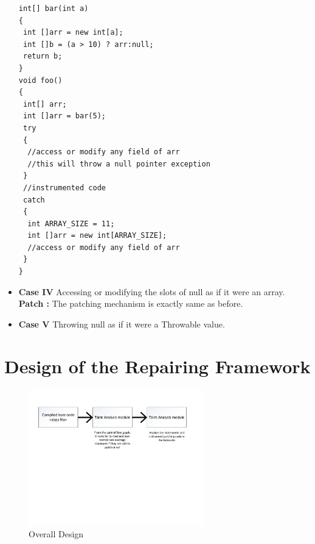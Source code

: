 \documentclass{sigplanconf}
\begin{document}
\begin{itemize}
  \lstset{language=Java, caption=array null pointer exception,
  label=patchingexample2}

\begin{lstlisting}
int[] bar(int a)
{
 int []arr = new int[a];
 int []b = (a > 10) ? arr:null;
 return b; 
}
void foo()
{
 int[] arr;
 int []arr = bar(5);
 try
 {
  //access or modify any field of arr
  //this will throw a null pointer exception
 }
 //instrumented code
 catch
 {
  int ARRAY_SIZE = 11;
  int []arr = new int[ARRAY_SIZE];
  //access or modify any field of arr
 }
}
\end{lstlisting}
  \item \textbf{Case IV} Accessing or modifying the slots of null as if it were
  an array.
 \textbf{Patch :} The patching mechanism is exactly same as before.
 
  \item \textbf{Case V} Throwing null as if it were a Throwable value.
\end{itemize}


\section{Design of the Repairing Framework}
\label{sec:Design}


\begin{figure}[!htb]
\centering
\includegraphics[width=3.0in]{images/OverallDesign.pdf}
\caption{Overall Design}
\label{fig:overallDesign}
\end{figure}


% 
\end{document}
